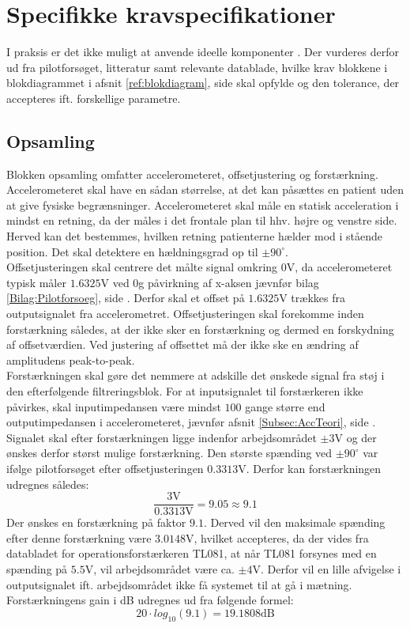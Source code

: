 \section{Specifikke kravspecifikationer}
I praksis er det ikke muligt at anvende ideelle komponenter \cite{Nilsson2011}. Der vurderes derfor ud fra pilotforsøget, litteratur samt relevante datablade, hvilke krav blokkene i blokdiagrammet i afsnit \ref{ref:blokdiagram}, side \pageref{ref:blokdiagram} skal opfylde og den tolerance, der accepteres ift. forskellige parametre.

\subsection{Opsamling}\label{OpsamlingsAfs}
Blokken opsamling omfatter accelerometeret, offsetjustering og forstærkning. Accelerometeret skal have en sådan størrelse, at det kan påsættes en patient uden at give fysiske begrænsninger. Accelerometeret skal måle en statisk acceleration i mindst en retning, da der måles i det frontale plan til hhv. højre og venstre side. Herved kan det bestemmes, hvilken retning patienterne hælder mod i stående position. Det skal detektere en hældningsgrad op til $\pm90^{\circ}$. \\
Offsetjusteringen skal centrere det målte signal omkring $0$V, da accelerometeret typisk måler $1.6325$V ved $0$g påvirkning af x-aksen jævnfør bilag \ref{Bilag:Pilotforsoeg}, side \pageref{Bilag:Pilotforsoeg}. Derfor skal et offset på $1.6325$V trækkes fra outputsignalet fra accelerometret. Offsetjusteringen skal forekomme inden forstærkning således, at der ikke sker en forstærkning og dermed en forskydning af offsetværdien. Ved justering af offsettet må der ikke ske en ændring af amplitudens peak-to-peak. \\
Forstærkningen skal gøre det nemmere at adskille det ønskede signal fra støj i den efterfølgende filtreringsblok. For at inputsignalet til forstærkeren ikke påvirkes, skal inputimpedansen være mindst $100$ gange større end outputimpedansen i accelerometeret, jævnfør afsnit \ref{Subsec:AccTeori}, side \pageref{Subsec:AccTeori}. Signalet skal efter forstærkningen ligge indenfor arbejdsområdet $\pm3$V og der ønskes derfor størst mulige forstærkning. Den største spænding ved $\pm90^{\circ}$ var ifølge pilotforsøget efter offsetjusteringen $0.3313$V. Derfor kan forstærkningen udregnes således:
\begin{equation}
\dfrac{3\text{V}}{0.3313\text{V}} =  9.05 \approx 9.1
\end{equation}
\noindent Der ønskes en forstærkning på faktor $9.1$. Derved vil den maksimale spænding efter denne forstærkning være $3.0148$V, hvilket accepteres, da der vides fra databladet for operationsforstærkeren TL081, at når TL081 forsynes med en spænding på $5.5$V, vil arbejdsområdet være ca. $\pm4$V. \cite{Corporation1995} Derfor vil en lille afvigelse i outputsignalet ift. arbejdsområdet ikke få systemet til at gå i mætning. Forstærkningens gain i dB udregnes ud fra følgende formel: 
\begin{equation}
20 \cdot log_{10} (9.1) = 19.1808\text{dB}
\end{equation} 

